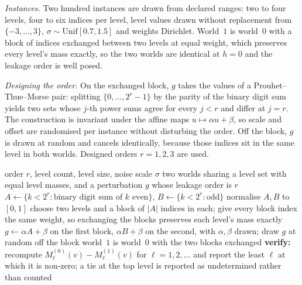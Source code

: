 \emph{Instances.} Two hundred instances are drawn from declared ranges: two to four levels,
four to six indices per level, level values drawn without replacement from
$\{-3,\dots,3\}$, $\sigma\sim\mathrm{Unif}[0.7,1.5]$ and weights Dirichlet. World~$1$ is
world~$0$ with a block of indices exchanged between two levels at equal weight, which
preserves every level's mass exactly, so the two worlds are identical at $h=0$ and the
leakage order is well posed.

\emph{Designing the order.} On the exchanged block, $g$ takes the values of a
Prouhet--Thue--Morse pair: splitting $\{0,\dots,2^{r}-1\}$ by the parity of the binary digit
sum yields two sets whose $j$-th power sums agree for every $j<r$ and differ at $j=r$. The
construction is invariant under the affine maps $u\mapsto\alpha u+\beta$, so scale and offset
are randomised per instance without disturbing the order. Off the block, $g$ is drawn at
random and cancels identically, because those indices sit in the same level in both worlds.
Designed orders $r=1,2,3$ are used.

\begin{algorithm}[htbp]
\caption{An instance with a designed leakage order $r$}
\label{alg:instance}
\begin{algorithmic}[1]
\REQUIRE order $r$, level count, level size, noise scale $\sigma$
\ENSURE two worlds sharing a level set with equal level masses, and a perturbation $g$ whose
        leakage order is $r$
\STATE $A\leftarrow\{k<2^{r}:\text{binary digit sum of }k\text{ even}\}$,
       $B\leftarrow\{k<2^{r}:\text{odd}\}$
\STATE normalise $A,B$ to $[0,1]$ 
\STATE choose two levels and a block of $|A|$ indices in each; give every block index the
       same weight, so exchanging the blocks preserves each level's mass exactly
\STATE $g\leftarrow\alpha A+\beta$ on the first block, $\alpha B+\beta$ on the second, with
       $\alpha,\beta$ drawn; draw $g$ at random off the block
\STATE world~$1$ is world~$0$ with the two blocks exchanged
\STATE \textbf{verify:} recompute $M^{(0)}_{\ell}(v)-M^{(1)}_{\ell}(v)$ for
       $\ell=1,2,\dots$ and report the least $\ell$ at which it is non-zero; a tie at the top
       level is reported as undetermined rather than counted
\end{algorithmic}
\end{algorithm}

